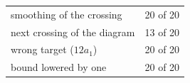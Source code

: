 {\begin{tabular}{lr}
smoothing of the crossing & 20 of 20\\
next crossing of the diagram & 13 of 20\\
wrong target ($12a_{1}$) & 20 of 20\\
bound lowered by one & 20 of 20\\
\bottomrule
\end{tabular}
}
